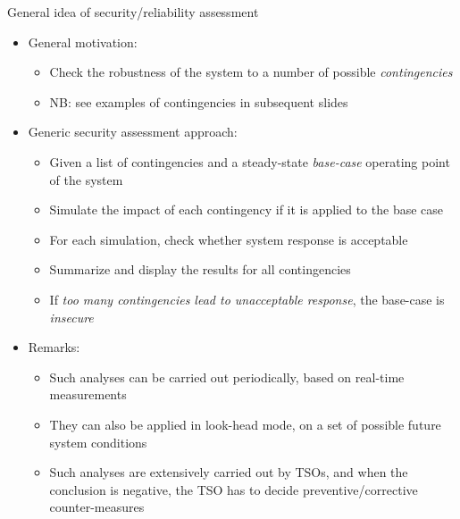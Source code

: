 \begin{frame}[allowframebreaks]{General idea of security/reliability assessment}
    \begin{itemize}
        \item General motivation:
        \begin{itemize}
            \item Check the robustness of the system to a number of possible \textit{contingencies}
            \item NB: see examples of contingencies in subsequent slides
        \end{itemize}
        \item Generic security assessment approach:
        \begin{itemize}
            \item Given a list of contingencies and a steady-state \textit{base-case} operating point of the system
            \item Simulate the impact of each contingency if it is applied to the base case
            \item For each simulation, check whether system response is acceptable
            \item Summarize and display the results for all contingencies
            \item If \textit{too many contingencies lead to unacceptable response}, the base-case is \textit{insecure}
        \end{itemize}
        \item Remarks:
        \begin{itemize}
            \item Such analyses can be carried out periodically, based on real-time measurements
            \item They can also be applied in look-head mode, on a set of possible future system conditions
            \item Such analyses are extensively carried out by TSOs, and when the conclusion is negative, the TSO has to decide preventive/corrective counter-measures
        \end{itemize}
    \end{itemize}
\end{frame}

